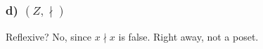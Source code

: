 \documentclass[11pt, oneside]{article} %
\numberwithin{equation}{section} %
\numberwithin{figure}{section} %
\numberwithin{table}{section} %
\begin{document}
\subsubsection{d) $(Z,\nmid)$}
Reflexive? No, since $x \nmid x $ is false. Right away, not a poset.












\end{document}
